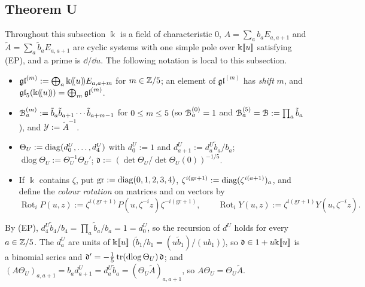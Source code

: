 \subsection{Theorem U}
\label{sec:gau-U}

Throughout this subsection $\Bbbk$ is a field of characteristic $0$, $A=\sum_ab_aE_{a,a+1}$ and $\tilde A=\sum_a\tilde b_aE_{a,a+1}$ are cyclic systems with one simple pole over $\Bbbk[\![ u ]\!]$ satisfying (EP), and a prime is $\dd/\dd u$. The following notation is local to this subsection.
\begin{itemize}
\item $\mathfrak{gl}^{(m)}:=\bigoplus_a\Bbbk(\!(u)\!)E_{a,a+m}$ for $m\in\mathbb{Z}/5$; an element of $\mathfrak{gl}^{(m)}$ has \emph{shift} $m$, and $\mathfrak{gl}_5(\Bbbk(\!(u)\!))=\bigoplus_m\mathfrak{gl}^{(m)}$.
\item $\mathcal{B}^{(m)}_a:=\tilde b_a\tilde b_{a+1}\cdots\tilde b_{a+m-1}$ for $0\leq m\leq5$ (so $\mathcal{B}^{(0)}_a=1$ and $\mathcal{B}^{(5)}_a=\mathcal{B}:=\prod_a\tilde b_a$), and $\mathcal Y:=\tilde A^{-1}$.
\item $\Theta_U:=\operatorname{diag}(d^U_0,\dots,d^U_4)$ with $d^U_0:=1$ and $d^U_{a+1}:=d^U_a\tilde b_a/b_a$; $\operatorname{dlog}\Theta_U:=\Theta_U^{-1}\Theta_U'$; $\mathfrak d:=(\det\Theta_U/\det\Theta_U(0))^{-1/5}$.
\item If $\Bbbk$ contains $\zeta$, put $\mathrm{gr}:=\operatorname{diag}(0,1,2,3,4)$, $\zeta^{i(\mathrm{gr}+1)}:=\operatorname{diag}(\zeta^{i(a+1)})_a$, and define the \emph{colour rotation} on matrices and on vectors by
\[
\operatorname{Rot}_iP(u,z):=\zeta^{i(\mathrm{gr}+1)}P(u,\zeta^{-i}z)\zeta^{-i(\mathrm{gr}+1)},\qquad \operatorname{Rot}_iY(u,z):=\zeta^{i(\mathrm{gr}+1)}Y(u,\zeta^{-i}z).
\]
\end{itemize}
By (EP), $d^U_4\tilde b_4/b_4=\prod_a\tilde b_a/b_a=1=d^U_0$, so the recursion of $d^U$ holds for every $a\in\mathbb{Z}/5$. The $d^U_a$ are units of $\Bbbk[\![ u ]\!]$ ($\tilde b_1/b_1=(u\tilde b_1)/(ub_1)$), so $\mathfrak d\in1+u\Bbbk[\![ u ]\!]$ is a binomial series and $\mathfrak d'=-\frac15\operatorname{tr}(\operatorname{dlog}\Theta_U)\,\mathfrak d$; and $(A\Theta_U)_{a,a+1}=b_ad^U_{a+1}=d^U_a\tilde b_a=(\Theta_U\tilde A)_{a,a+1}$, so $A\Theta_U=\Theta_U\tilde A$.

